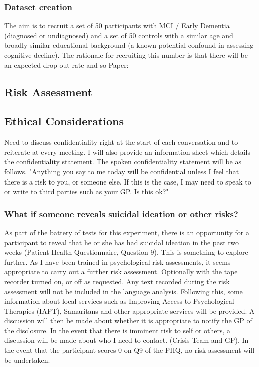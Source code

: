 \documentclass{article}
\begin{document}
\subsubsection{Dataset creation}
The aim is to recruit a set of 50 participants with MCI / Early Dementia (diagnosed or undiagnosed) and a set of 50 controls with a similar age and broadly similar educational background (a known potential confound in assessing cognitive decline). The rationale for recruiting this number is that there will be an expected drop out rate and so
Paper:


\subsection{Risk Assessment}

\subsection{Ethical Considerations}
Need to discuss confidentiality right at the start of each conversation and to reiterate at every meeting. I will also provide an information sheet which details the confidentiality statement. The spoken confidentiality statement will be as follows.
"Anything you say to me today will be confidential unless I feel that there is a risk to you, or someone else. If this is the case, I may need to speak to or write to third parties such as your GP. Is this ok?" \newline
\par
\subsubsection{What if someone reveals suicidal ideation or other risks?}
As part of the battery of tests for this experiment, there is an opportunity for a participant to reveal that he or she has had suicidal ideation in the past two weeks (Patient Health Questionnaire, Question 9). This is something to explore further. As I have been trained in psychological risk assessments, it seems appropriate to carry out a further risk assessment.  Optionally with the tape recorder turned on, or off as requested.  Any text recorded during the risk assessment will not be included in the language analysis. Following this, some information about local services such as Improving Access to Psychological Therapies (IAPT), Samaritans and other appropriate services will be provided. A discussion will then be made about whether it is appropriate to notify the GP of the disclosure. In the event that there is imminent risk to self or others, a discussion will be made about who I need to contact. (Crisis Team and GP). In the event that the participant scores 0 on Q9 of the PHQ, no risk assessment will be undertaken. \newline
\end{document}
